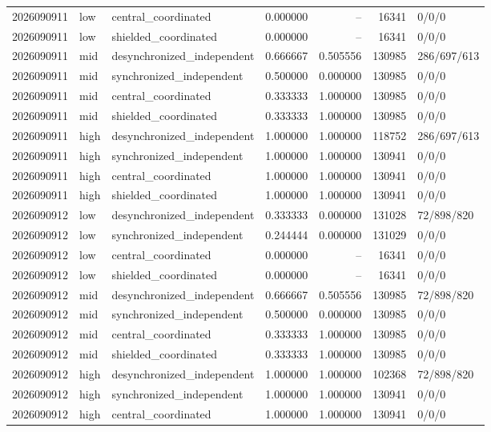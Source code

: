 \begin{longtable}{llp{38mm}rrrp{30mm}}
2026090911 & low & central\_coordinated & 0.000000 & -- & 16341 & 0/0/0 \\
2026090911 & low & shielded\_coordinated & 0.000000 & -- & 16341 & 0/0/0 \\
2026090911 & mid & desynchronized\_independent & 0.666667 & 0.505556 & 130985 & 286/697/613 \\
2026090911 & mid & synchronized\_independent & 0.500000 & 0.000000 & 130985 & 0/0/0 \\
2026090911 & mid & central\_coordinated & 0.333333 & 1.000000 & 130985 & 0/0/0 \\
2026090911 & mid & shielded\_coordinated & 0.333333 & 1.000000 & 130985 & 0/0/0 \\
2026090911 & high & desynchronized\_independent & 1.000000 & 1.000000 & 118752 & 286/697/613 \\
2026090911 & high & synchronized\_independent & 1.000000 & 1.000000 & 130941 & 0/0/0 \\
2026090911 & high & central\_coordinated & 1.000000 & 1.000000 & 130941 & 0/0/0 \\
2026090911 & high & shielded\_coordinated & 1.000000 & 1.000000 & 130941 & 0/0/0 \\
2026090912 & low & desynchronized\_independent & 0.333333 & 0.000000 & 131028 & 72/898/820 \\
2026090912 & low & synchronized\_independent & 0.244444 & 0.000000 & 131029 & 0/0/0 \\
2026090912 & low & central\_coordinated & 0.000000 & -- & 16341 & 0/0/0 \\
2026090912 & low & shielded\_coordinated & 0.000000 & -- & 16341 & 0/0/0 \\
2026090912 & mid & desynchronized\_independent & 0.666667 & 0.505556 & 130985 & 72/898/820 \\
2026090912 & mid & synchronized\_independent & 0.500000 & 0.000000 & 130985 & 0/0/0 \\
2026090912 & mid & central\_coordinated & 0.333333 & 1.000000 & 130985 & 0/0/0 \\
2026090912 & mid & shielded\_coordinated & 0.333333 & 1.000000 & 130985 & 0/0/0 \\
2026090912 & high & desynchronized\_independent & 1.000000 & 1.000000 & 102368 & 72/898/820 \\
2026090912 & high & synchronized\_independent & 1.000000 & 1.000000 & 130941 & 0/0/0 \\
2026090912 & high & central\_coordinated & 1.000000 & 1.000000 & 130941 & 0/0/0 \\

\end{longtable}
